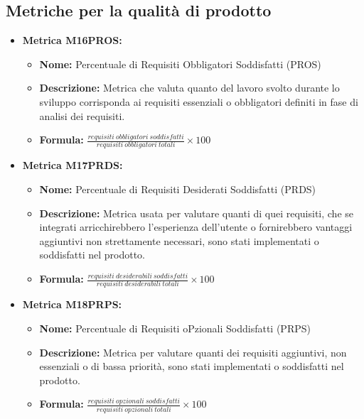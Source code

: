 \subsection{Metriche per la qualità di prodotto}
\begin{itemize}
    
    \item \textbf{Metrica M16PROS:}
    \begin{itemize}
     \item \textbf{Nome:} Percentuale di Requisiti Obbligatori Soddisfatti (PROS)
     \item \textbf{Descrizione:} Metrica che valuta quanto del lavoro svolto durante lo sviluppo corrisponda ai requisiti essenziali o obbligatori definiti in fase di analisi dei requisiti.
     \item \textbf{Formula:} $\frac{requisiti \ obbligatori \ soddisfatti}{requisiti \ obbligatori \ totali}\times 100$
    \end{itemize}

    \item \textbf{Metrica M17PRDS:}
    \begin{itemize}
     \item \textbf{Nome:} Percentuale di Requisiti Desiderati Soddisfatti (PRDS)
     \item \textbf{Descrizione:} Metrica usata per valutare quanti di quei requisiti, che se integrati arricchirebbero l'esperienza dell'utente o fornirebbero vantaggi aggiuntivi non strettamente necessari, sono stati implementati o soddisfatti nel prodotto.
     \item \textbf{Formula:} $\frac{requisiti \ desiderabili \ soddisfatti}{requisiti \ desiderabili \ totali}\times 100$
    \end{itemize}

    \item \textbf{Metrica M18PRPS:}
    \begin{itemize}
     \item \textbf{Nome:} Percentuale di Requisiti oPzionali Soddisfatti (PRPS)
     \item \textbf{Descrizione:} Metrica per valutare quanti dei requisiti aggiuntivi, non essenziali o di bassa priorità, sono stati implementati o soddisfatti nel prodotto.
     \item \textbf{Formula:} $\frac{requisiti \ opzionali \ soddisfatti}{requisiti \ opzionali \ totali}\times 100$
    \end{itemize}


\end{itemize}
